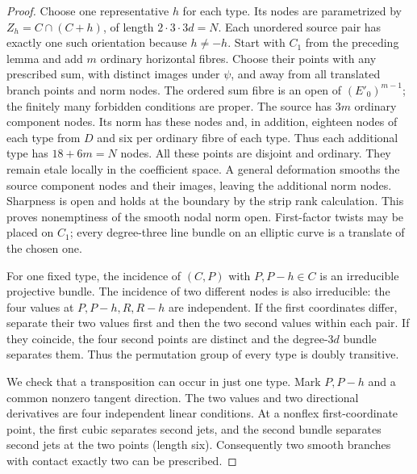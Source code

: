 \begin{proof}
Choose one representative $h$ for each type. Its nodes are
parametrized by $Z_h=C\cap(C+h)$, of length $2\cdot3\cdot3d=N$.
Each unordered source pair has exactly one such orientation because
$h\ne-h$. Start with $C_1$ from the preceding lemma and add $m$
ordinary horizontal fibres. Choose their points with any prescribed
sum, with distinct images under $\psi$, and away from all translated
branch points and norm nodes. The ordered sum fibre is an open of
$(E'_0)^{m-1}$; the finitely many forbidden conditions are proper.
The source has $3m$ ordinary component nodes. Its norm has these
nodes and, in addition, eighteen nodes of each type from $D$ and
six per ordinary fibre of each type. Thus each additional type has
$18+6m=N$ nodes. All these points are disjoint and ordinary.
They remain etale locally in the coefficient space. A general
deformation smooths the source component nodes and their images,
leaving the additional norm nodes. Sharpness is open and holds
at the boundary by the strip rank calculation. This proves
nonemptiness of the smooth nodal norm open. First-factor twists
may be placed on $C_1$; every degree-three line bundle on an
elliptic curve is a translate of the chosen one.

For one fixed type, the incidence of $(C,P)$ with $P,P-h\in C$
is an irreducible projective bundle. The incidence of two different
nodes is also irreducible: the four values at
$P,P-h,R,R-h$ are independent. If the first coordinates differ,
separate their two values first and then the two second values
within each pair. If they coincide, the four second points are
distinct and the degree-$3d$ bundle separates them. Thus the
permutation group of every type is doubly transitive.

We check that a transposition can occur in just one type. Mark
$P,P-h$ and a common nonzero tangent direction. The two values
and two directional derivatives are four independent linear
conditions. At a nonflex first-coordinate point, the first cubic
separates second jets, and the second bundle separates second
jets at the two points (length six). Consequently two smooth
branches with contact exactly two can be prescribed.


\end{proof}
